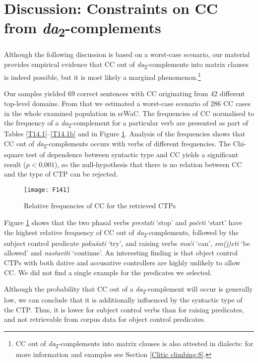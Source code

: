 \section{Discussion: Constraints on CC from \textit{da}\textsubscript{2}-complements}
\label{Discussion:da}

Although the following discussion is based on a worst-case scenario, our material provides empirical evidence that CC out of \textit{da}\textsubscript{2}-complements into matrix clauses is indeed possible, but it is most likely a marginal phenomenon.\footnote{CC out of \textit{da}\textsubscript{2}-complements into matrix clauses is also attested in dialects: for more information and examples see Section \ref{Clitic climbing:8}.}

Our samples yielded 69 correct sentences with CC originating from 42 different top-level domains. From that we estimated a worst-case scenario of 286 CC cases in the whole examined population in srWaC. The frequencies of CC normalised to the frequency of a \textit{da}\textsubscript{2}-complement for a particular verb are presented as part of Tables \ref{T14.1}--\ref{T14.1b} and in Figure \ref{F14.1}. Analysis of the frequencies shows that CC out of \textit{da}\textsubscript{2}-complements occurs with verbs of different frequencies. The Chi-square test of dependence between syntactic type and CC yields a significant result ($p<0.001$), so the null-hypothesis that there is no relation between CC and the type of CTP  can be rejected.


\begin{figure}
\caption[Relative frequencies of CC for the retrieved CTPs]{Relative frequencies of CC for the retrieved CTPs\label{F14.1}}
\texttt{[image: F141]}
\end{figure}


Figure \ref{F14.1} shows that the two phasal verbs \textit{prestati} ‘stop’ and \textit{početi} ‘start’ have the highest relative frequency of CC out of \textit{da}\textsubscript{2}-complements, followed by the subject control predicate \textit{pokušati} ‘try’, and raising verbs \textit{moći} ‘can’, \textit{sm(j)eti} ‘be allowed’ and \textit{nastaviti} ‘continue’. An interesting finding is that object control CTPs with both dative and accusative controllers are highly unlikely to allow CC. We did not find a single example for the predicates we selected.

Although the probability that CC out of a \textit{da}\textsubscript{2}-complement will occur is generally low, we can conclude that it is additionally influenced by the syntactic type of the CTP. Thus, it is lower for subject control verbs than for raising predicates, and not retrievable from corpus data for object control predicates.

